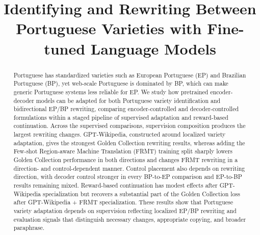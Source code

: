 \documentclass[acmtog,nonacm]{acmart}
\begin{document}
\title{Identifying and Rewriting Between Portuguese Varieties with Fine-tuned Language Models}

\author{\texorpdfstring{}{Rodrigo Laia}}


\renewcommand{\shortauthors}{Laia}

\begin{abstract}
Portuguese has standardized varieties such as European Portuguese (EP) and Brazilian Portuguese (BP), yet web-scale Portuguese is dominated by BP, which can make generic Portuguese systems less reliable for EP. We study how pretrained encoder-decoder models can be adapted for both Portuguese variety identification and bidirectional EP/BP rewriting, comparing encoder-controlled and decoder-controlled formulations within a staged pipeline of supervised adaptation and reward-based continuation. Across the supervised comparisons, supervision composition produces the largest rewriting changes. GPT-Wikipedia, constructed around localized variety adaptation, gives the strongest Golden Collection rewriting results, whereas adding the Few-shot Region-aware Machine Translation (FRMT) training split sharply lowers Golden Collection performance in both directions and changes FRMT rewriting in a direction- and control-dependent manner. Control placement also depends on rewriting direction, with decoder control stronger in every BP-to-EP comparison and EP-to-BP results remaining mixed. Reward-based continuation has modest effects after GPT-Wikipedia specialization but recovers a substantial part of the Golden Collection loss after GPT-Wikipedia + FRMT specialization. These results show that Portuguese variety adaptation depends on supervision reflecting localized EP/BP rewriting and evaluation signals that distinguish necessary changes, appropriate copying, and broader paraphrase.
\end{abstract}
\end{document}
